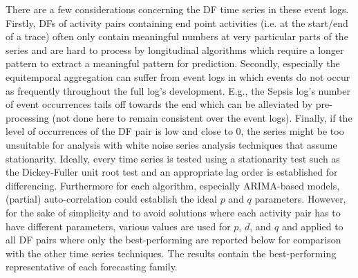 There are a few considerations concerning the DF time series in these event logs.
Firstly, DFs of activity pairs containing end point activities (i.e. at the start/end of a trace) often only contain meaningful numbers at very particular parts of the series and are hard to process by longitudinal algorithms which require a longer pattern to extract a meaningful pattern for prediction.
Secondly, especially the equitemporal aggregation can suffer from event logs in which events do not occur as frequently throughout the full log's development.
E.g., the Sepsis log's number of event occurrences tails off towards the end which can be alleviated by pre-processing (not done here to remain consistent over the event logs).
Finally, if the level of occurrences of the DF pair is low and close to 0, the series might be too unsuitable for analysis with white noise series analysis techniques that assume stationarity.
Ideally, every time series is tested using a stationarity test such as the Dickey-Fuller unit root test \cite{leybourne1995testing} and an appropriate lag order is established for differencing. 
Furthermore for each algorithm, especially ARIMA-based models, (partial) auto-correlation could establish the ideal $p$ and $q$ parameters.
However, for the sake of simplicity and to avoid solutions where each activity pair has to have different parameters, various values are used for $p$, $d$, and $q$ and applied to all DF pairs where only the best-performing are reported below for comparison with the other time series techniques.
The results contain the best-performing representative of each forecasting family.

